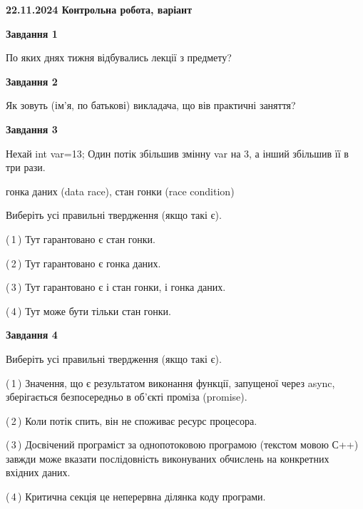 \documentclass[12pt, ukrainian]{article}
\begin{document}
\begin {large}

\textbf{22.11.2024 Контрольна робота, варіант  }\par


{

\begin{center}
\textbf{Завдання 1}
\end{center}

По яких днях тижня відбувались лекції з предмету?


\begin{center}
\textbf{Завдання 2}
\end{center}

Як зовуть (ім'я, по батькові) викладача, що вів практичні заняття?


\begin{center}
\textbf{Завдання 3}
\end{center}

Нехай int var=13; Один потік збільшив змінну var на 3, а інший збільшив її в три рази.

гонка даних (data race), стан гонки (race condition)

Виберіть усі правильні твердження (якщо такі є).\par
\vspace{2mm}
(\,1\,) Тут гарантовано є стан гонки.%

(\,2\,) Тут гарантовано є гонка даних.%

(\,3\,) Тут гарантовано є і стан гонки, і гонка даних.%

(\,4\,) Тут може бути тільки стан гонки.%


\begin{center}
\textbf{Завдання 4}
\end{center}

Виберіть усі правильні твердження (якщо такі є).\par
\vspace{2mm}

(\,1\,) Значення, що є результатом виконання функції, запущеної через async, зберігається безпосередньо в об’єкті проміза (promise).%

(\,2\,) Коли потік спить, він не споживає ресурс процесора.%

(\,3\,) Досвічений програміст за однопотоковою програмою (текстом мовою С++) завжди може вказати послідовність виконуваних обчислень на конкретних вхідних даних.%

(\,4\,) Критична секція це неперервна ділянка коду програми.%


}
\end{large}
\end{document}
